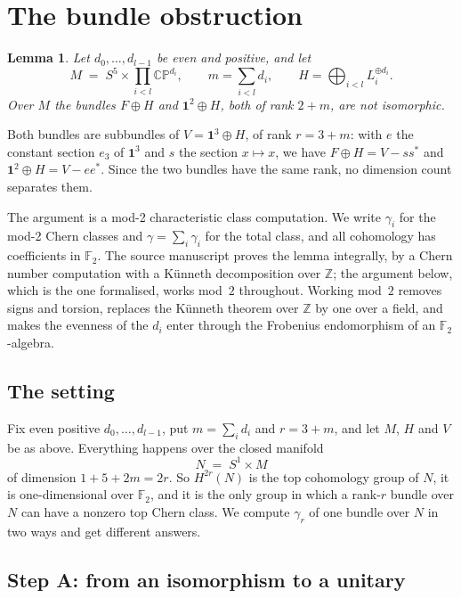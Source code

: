 \documentclass[11pt]{amsart}
\newcommand{\leanverified}[2]{\ignorespaces}
\newtheorem{lemma}[theorem]{Lemma}
\theoremstyle{plain}
\theoremstyle{definition}
\newcommand{\F}{\mathbb F}
\newcommand{\CP}{\mathbb{CP}}
\begin{document}
\section{The bundle obstruction}
\label{sec:modtwo}

\begin{lemma}
\label{lem:two}
Let $d_0,\dots,d_{l-1}$ be even and positive, and let
\[
  M \;=\; S^5 \times \prod_{i<l} \CP^{d_i},
  \qquad m = \sum_{i<l} d_i ,
  \qquad H = \bigoplus_{i<l} L_i^{\oplus d_i}.
\]
Over $M$ the bundles $F \oplus H$ and $\mathbf 1^2 \oplus H$, both of rank
$2+m$, are not isomorphic.
\leanverified{lem:two}{GroupApproximation.LIX.LemmaTwoHolds}
\end{lemma}

Both bundles are subbundles of $V = \mathbf 1^3 \oplus H$, of rank $r = 3+m$:
with $e$ the constant section $e_3$ of $\mathbf 1^3$ and $s$ the section
$x \mapsto x$, we have $F \oplus H = V - ss^{*}$ and
$\mathbf 1^2 \oplus H = V - ee^{*}$.  Since the two bundles have the same rank,
no dimension count separates them.

The argument is a mod-2 characteristic class computation.  We write
$\gamma_i$ for the mod-2 Chern classes and $\gamma = \sum_i \gamma_i$ for the
total class, and all cohomology has coefficients in $\F_2$.  The source
manuscript proves the lemma integrally, by a Chern number computation with a
K\"unneth decomposition over $\mathbb Z$; the argument below, which is the one
formalised, works mod~$2$ throughout.  Working mod~$2$ removes signs and
torsion, replaces the K\"unneth theorem over $\mathbb Z$ by one over a field,
and makes the evenness of the $d_i$ enter through the Frobenius endomorphism
of an $\F_2$-algebra.

\subsection{The setting}

Fix even positive $d_0,\dots,d_{l-1}$, put $m = \sum_i d_i$ and $r = 3+m$, and
let $M$, $H$ and $V$ be as above.  Everything happens over the closed manifold
\[
  N \;=\; S^1 \times M
\]
of dimension $1 + 5 + 2m = 2r$.  So $H^{2r}(N)$ is the top cohomology group of
$N$, it is one-dimensional over $\F_2$, and it is the only group in which a
rank-$r$ bundle over $N$ can have a nonzero top Chern class.  We compute
$\gamma_r$ of one bundle over $N$ in two ways and get different answers.

\subsection{Step A: from an isomorphism to a unitary}
\end{document}
